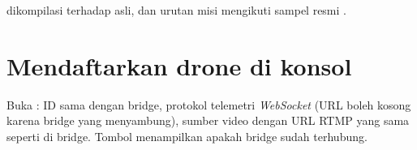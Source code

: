 \begin{catatan}
 dikompilasi terhadap  asli, dan urutan misi mengikuti sampel resmi .
\end{catatan}

\section{Mendaftarkan drone di konsol}
Buka : ID sama dengan bridge, protokol telemetri \emph{WebSocket} (URL boleh kosong karena bridge yang menyambung), sumber video dengan URL RTMP yang sama seperti di bridge. Tombol  menampilkan apakah bridge sudah terhubung.
